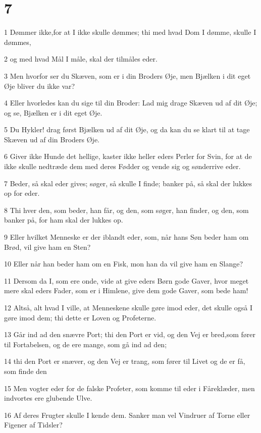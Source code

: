 \chapter{7}

\par 1 Dømmer ikke,for at I ikke skulle dømmes; thi med hvad Dom I dømme, skulle I dømmes,
\par 2 og med hvad Mål I måle, skal der tilmåles eder.
\par 3 Men hvorfor ser du Skæven, som er i din Broders Øje, men Bjælken i dit eget Øje bliver du ikke var?
\par 4 Eller hvorledes kan du sige til din Broder: Lad mig drage Skæven ud af dit Øje; og se, Bjælken er i dit eget Øje.
\par 5 Du Hykler! drag først Bjælken ud af dit Øje, og da kan du se klart til at tage Skæven ud af din Broders Øje.
\par 6 Giver ikke Hunde det hellige, kaster ikke heller eders Perler for Svin, for at de ikke skulle nedtræde dem med deres Fødder og vende sig og sønderrive eder.
\par 7 Beder, så skal eder gives; søger, så skulle I finde; banker på, så skal der lukkes op for eder.
\par 8 Thi hver den, som beder, han får, og den, som søger, han finder, og den, som banker på, for ham skal der lukkes op.
\par 9 Eller hvilket Menneske er der iblandt eder, som, når hans Søn beder ham om Brød, vil give ham en Sten?
\par 10 Eller når han beder ham om en Fisk, mon han da vil give ham en Slange?
\par 11 Dersom da I, som ere onde, vide at give eders Børn gode Gaver, hvor meget mere skal eders Fader, som er i Himlene, give dem gode Gaver, som bede ham!
\par 12 Altså, alt hvad I ville, at Menneskene skulle gøre imod eder, det skulle også I gøre imod dem; thi dette er Loven og Profeterne.
\par 13 Går ind ad den snævre Port; thi den Port er vid, og den Vej er bred,som fører til Fortabelsen, og de ere mange, som gå ind ad den;
\par 14 thi den Port er snæver, og den Vej er trang, som fører til Livet og de er få, som finde den
\par 15 Men vogter eder for de falske Profeter, som komme til eder i Fåreklæder, men indvortes ere glubende Ulve.
\par 16 Af deres Frugter skulle I kende dem. Sanker man vel Vindruer af Torne eller Figener af Tidsler?
